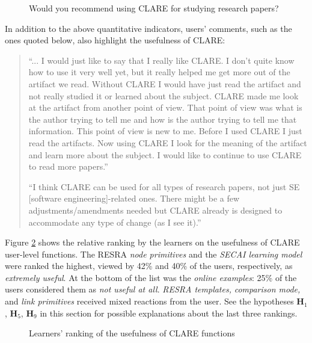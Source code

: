 \begin{figure}[hbtp]
  \caption{Would you recommend using CLARE for studying research papers?}
  \label{fig:future-use}
\end{figure}

In addition to the above quantitative indicators, users' comments, such as
the ones quoted below, also highlight the usefulness of CLARE:

\small
\begin{quotation}
  ``... I would just like to say that I really like CLARE.  I don't quite
  know how to use it very well yet, but it really helped me get more out
  of the artifact we read.  Without CLARE I would have just read the
  artifact and not really studied it or learned about the subject. CLARE
  made me look at the artifact from another point of view.  That point of
  view was what is the author trying to tell me and how is the author
  trying to tell me that information.  This point of view is new to me.
  Before I used CLARE I just read the artifacts.  Now using CLARE I look
  for the meaning of the artifact and learn more about the subject. I
  would like to continue to use CLARE to read more papers.'' \\ \par
  
  ``I think CLARE can be used for all types of research papers, not just
  SE [software engineering]-related ones. There might be a few
  adjustments/amendments needed but CLARE already is designed to
  accommodate any type of change (as I see it).''
\end{quotation}
\normalsize
{}


Figure \ref{fig:clare-features} shows the relative ranking by the learners
on the usefulness of CLARE user-level functions. The RESRA {\it node
primitives\/} and the {\it SECAI learning model\/} were ranked the highest,
viewed by 42\% and 40\% of the users, respectively, as {\it extremely
useful\/}. At the bottom of the list was the {\it online examples\/}: 25\%
of the users considered them as {\it not useful at all\/}. {\it RESRA
templates,\/} {\it comparison mode,\/} and {\it link primitives\/} received
mixed reactions from the user. See the hypotheses {\bf H\(_1\)}, {\bf
H\(_5\)}, {\bf H\(_9\)} in this section for possible explanations about the
last three rankings.


\begin{figure}[hbtp]
 \caption{Learners' ranking of the usefulness of CLARE functions}
  \label{fig:clare-features}
\end{figure}


